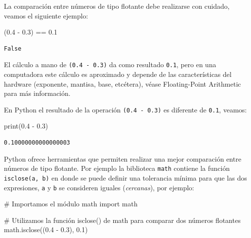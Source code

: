 \documentclass[
  spanish,
  letterpaper,
]{scrbook}
\newenvironment{Shaded}{\begin{snugshade}}{\end{snugshade}}
\newcommand{\BuiltInTok}[1]{\textcolor[rgb]{0.00,0.23,0.31}{#1}}
\newcommand{\CommentTok}[1]{\textcolor[rgb]{0.37,0.37,0.37}{#1}}
\newcommand{\FloatTok}[1]{\textcolor[rgb]{0.68,0.00,0.00}{#1}}
\newcommand{\ImportTok}[1]{\textcolor[rgb]{0.00,0.46,0.62}{#1}}
\newcommand{\NormalTok}[1]{\textcolor[rgb]{0.00,0.23,0.31}{#1}}
\newcommand{\OperatorTok}[1]{\textcolor[rgb]{0.37,0.37,0.37}{#1}}
\theoremstyle{definition}
\theoremstyle{remark}
\begin{document}
La comparación entre números de tipo flotante debe realizarse con
cuidado, veamos el siguiente ejemplo:

\begin{Shaded}
\begin{Highlighting}[]
\NormalTok{(}\FloatTok{0.4} \OperatorTok{{-}} \FloatTok{0.3}\NormalTok{) }\OperatorTok{==} \FloatTok{0.1}
\end{Highlighting}
\end{Shaded}

\begin{verbatim}
False
\end{verbatim}

El cálculo a mano de \texttt{(0.4\ -\ 0.3)} da como resultado
\texttt{0.1}, pero en una computadora este cálculo es aproximado y
depende de las características del hardware (exponente, mantisa, base,
etcétera), véase Floating-Point Arithmetic para más información.

En Python el resultado de la operación \texttt{(0.4\ -\ 0.3)} es
diferente de \texttt{0.1}, veamos:

\begin{Shaded}
\begin{Highlighting}[]
\BuiltInTok{print}\NormalTok{(}\FloatTok{0.4} \OperatorTok{{-}} \FloatTok{0.3}\NormalTok{)}
\end{Highlighting}
\end{Shaded}

\begin{verbatim}
0.10000000000000003
\end{verbatim}

Python ofrece herramientas que permiten realizar una mejor comparación
entre números de tipo flotante. Por ejemplo la biblioteca \texttt{math}
contiene la función \texttt{isclose(a,\ b)} en donde se puede definir
una tolerancia mínima para que las dos expresiones, \texttt{a} y
\texttt{b} se consideren iguales (\emph{cercanas}), por ejemplo:

\begin{Shaded}
\begin{Highlighting}[]
\CommentTok{\# Importamos el módulo math}
\ImportTok{import}\NormalTok{ math}

\CommentTok{\# Utilizamos la función \textasciigrave{}isclose()\textasciigrave{} de math para comparar dos números flotantes}
\NormalTok{math.isclose((}\FloatTok{0.4} \OperatorTok{{-}} \FloatTok{0.3}\NormalTok{), }\FloatTok{0.1}\NormalTok{)}
\end{Highlighting}
\end{Shaded}
\end{document}
